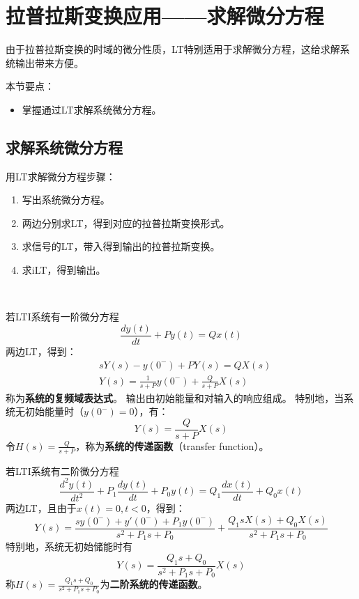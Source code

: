 \section{拉普拉斯变换应用——求解微分方程}

由于拉普拉斯变换的时域的微分性质，LT特别适用于求解微分方程，这给求解系统输出带来方便。

本节要点：
\begin{itemize}
    \item 掌握通过LT求解系统微分方程。
\end{itemize}

\subsection{求解系统微分方程}

用LT求解微分方程步骤：
\begin{enumerate}
    \item 写出系统微分方程。
    \item 两边分别求LT，得到对应的拉普拉斯变换形式。
    \item 求信号的LT，带入得到输出的拉普拉斯变换。
    \item 求iLT，得到输出。
\end{enumerate}

~

若LTI系统有一阶微分方程
\[
\frac{dy\left( t \right)}{dt}+Py\left( t \right) =Qx\left( t \right)
\]
两边LT，得到：
\begin{align*}
&sY\left( s \right) -y\left( 0^- \right) +PY\left( s \right) =QX\left( s \right) \\
&Y\left( s \right) =\frac{1}{s+P}y\left( 0^- \right) +\frac{Q}{s+P}X\left( s \right)
\end{align*}
称为{\bf 系统的复频域表达式}。
输出由初始能量和对输入的响应组成。
特别地，当系统无初始能量时（$y\left( 0^- \right) =0$），有：
\[
Y\left( s \right) =\frac{Q}{s+P}X\left( s \right)
\]
令$H\left( s \right) =\frac{Q}{s+P}$，称为{\bf 系统的传递函数}（transfer function）。

若LTI系统有二阶微分方程
\[
\frac{d^2y\left( t \right)}{dt^2}+P_1\frac{dy\left( t \right)}{dt}+P_0y\left( t \right) =Q_1\frac{dx\left( t \right)}{dt}+Q_0x\left( t \right)
\]
两边LT，且由于$x\left( t \right) =0,t<0$，得到：
\[
Y\left( s \right) =\frac{sy\left( 0^- \right) +y'\left( 0^- \right) +P_1y\left( 0^- \right)}{s^2+P_1s+P_0}+\frac{Q_1sX\left( s \right) +Q_0X\left( s \right)}{s^2+P_1s+P_0}
\]
特别地，系统无初始储能时有
\[
Y\left( s \right) =\frac{Q_1s+Q_0}{s^2+P_1s+P_0}X\left( s \right)
\]
称$H\left( s \right) =\frac{Q_1s+Q_0}{s^2+P_1s+P_0}$为{\bf 二阶系统的传递函数}。

